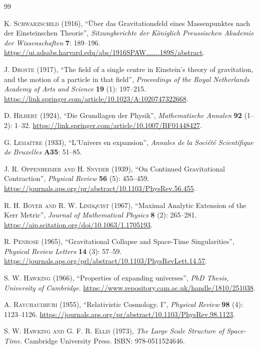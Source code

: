 \documentclass{article}
\begin{document}
\begin{thebibliography}{99}

\textsc{K. Schwarzschild} (1916), ``\"Uber das Gravitationsfeld eines Massenpunktes nach der Einsteinschen Theorie'', \textit{Sitzungberichte der K\"oniglich Preussischen Akademie der Wissenschaften} \textbf{7}: 189--196. \url{https://ui.adsabs.harvard.edu/abs/1916SPAW.......189S/abstract}.

\textsc{J. Droste} (1917), ``The field of a single centre in Einstein's theory of gravitation, and the motion of a particle in that field'', \textit{Proceedings of the Royal Netherlands Academy of Arts and Science} \textbf{19} (1): 197--215. \url{https://link.springer.com/article/10.1023/A:1020747322668}.

\textsc{D. Hilbert} (1924), ``Die Grundlagen der Physik'', \textit{Mathematische Annalen} \textbf{92} (1--2): 1--32. \url{https://link.springer.com/article/10.1007/BF01448427}.

\textsc{G. Lema\^itre} (1933), ``L'Univers en expansion'', \textit{Annales de la Soci\'et\'e Scientifique de Bruxelles} \textbf{A35}: 51--85.

\textsc{J. R. Oppenheimer and H. Snyder} (1939), ``On Continued Gravitational Contraction'', \textit{Physical Review} \textbf{56} (5): 455--459. \url{https://journals.aps.org/pr/abstract/10.1103/PhysRev.56.455}.

\textsc{R. H. Boyer and R. W. Lindquist} (1967), ``Maximal Analytic Extension of the Kerr Metric'', \textit{Journal of Mathematical Physics} \textbf{8} (2): 265--281. \url{https://aip.scitation.org/doi/10.1063/1.1705193}.

\textsc{R. Penrose} (1965), ``Gravitational Collapse and Space-Time Singularities'', \textit{Physical Review Letters} \textbf{14} (3): 57--59. \url{https://journals.aps.org/prl/abstract/10.1103/PhysRevLett.14.57}.

\textsc{S. W. Hawking} (1966), ``Properties of expanding universes'', \textit{PhD Thesis, University of Cambridge}. \url{https://www.repository.cam.ac.uk/handle/1810/251038}.

\textsc{A. Raychaudhuri} (1955), ``Relativistic Cosmology. I'', \textit{Physical Review} \textbf{98} (4): 1123--1126. \url{https://journals.aps.org/pr/abstract/10.1103/PhysRev.98.1123}.

\textsc{S. W. Hawking and G. F. R. Ellis} (1973), \textit{The Large Scale Structure of Space-Time}. Cambridge University Press. ISBN: 978-0511524646.


\end{thebibliography}
\end{document}
